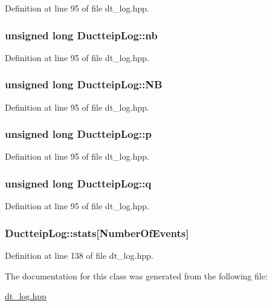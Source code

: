Definition at line 95 of file dt\_\-log.hpp.\hypertarget{class_ductteip_log_a12b797b756a43b05d3cd088678a42a0e}{
\subsubsection[{nb}]{\setlength{\rightskip}{0pt plus 5cm}unsigned long {\bf DuctteipLog::nb}}}
\label{class_ductteip_log_a12b797b756a43b05d3cd088678a42a0e}


Definition at line 95 of file dt\_\-log.hpp.\hypertarget{class_ductteip_log_a3cc06c9c2b21c0a3fa306e32b7935d18}{
\subsubsection[{NB}]{\setlength{\rightskip}{0pt plus 5cm}unsigned long {\bf DuctteipLog::NB}}}
\label{class_ductteip_log_a3cc06c9c2b21c0a3fa306e32b7935d18}


Definition at line 95 of file dt\_\-log.hpp.\hypertarget{class_ductteip_log_a6009ec1dd40a5e1e6244ac6294ba5cf3}{
\subsubsection[{p}]{\setlength{\rightskip}{0pt plus 5cm}unsigned long {\bf DuctteipLog::p}}}
\label{class_ductteip_log_a6009ec1dd40a5e1e6244ac6294ba5cf3}


Definition at line 95 of file dt\_\-log.hpp.\hypertarget{class_ductteip_log_a200ae8fc4dd3645f8227adc0f5fd16aa}{
\subsubsection[{q}]{\setlength{\rightskip}{0pt plus 5cm}unsigned long {\bf DuctteipLog::q}}}
\label{class_ductteip_log_a200ae8fc4dd3645f8227adc0f5fd16aa}


Definition at line 95 of file dt\_\-log.hpp.\hypertarget{class_ductteip_log_aef20239edd3dbb2d80ce65be13689f20}{
\subsubsection[{stats}]{ {\bf DuctteipLog::stats}\mbox{[}NumberOfEvents\mbox{]}}}
\label{class_ductteip_log_aef20239edd3dbb2d80ce65be13689f20}


Definition at line 138 of file dt\_\-log.hpp.

The documentation for this class was generated from the following file:\begin{DoxyCompactItemize}
\item 
\hyperlink{dt__log_8hpp}{dt\_\-log.hpp}\end{DoxyCompactItemize}

